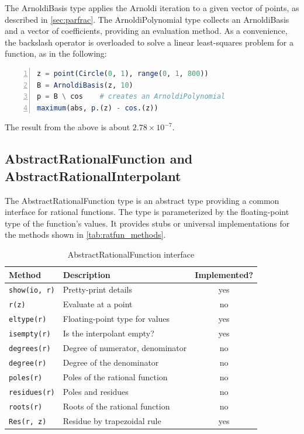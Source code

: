\documentclass{juliacon}
\begin{document}
The {ArnoldiBasis} type applies the Arnoldi iteration to a given vector of points, as described in \autoref{sec:parfrac}. The {ArnoldiPolynomial} type collects an {ArnoldiBasis} and a vector of coefficients, providing an evaluation method. As a convenience, the backslash operator is overloaded to solve a linear least-squares problem for a function, as in the following:
\begin{lstlisting}[language = Julia, numbers=left, label={lst:exmplg}, caption={Least-squares for an {ArnoldiBasis}.}]
z = point(Circle(0, 1), range(0, 1, 800))
B = ArnoldiBasis(z, 10)
p = B \ cos    # creates an ArnoldiPolynomial
maximum(abs, p.(z) - cos.(z))
\end{lstlisting}
The result from the above is about $2.78 \times 10^{-7}$. 

\subsection{AbstractRationalFunction and AbstractRationalInterpolant}

The {AbstractRationalFunction} type is an abstract type providing a common interface for rational functions. The type is parameterized by the floating-point type of the function's values. It provides stubs or universal implementations for the methods shown in \autoref{tab:ratfun_methods}. 

\begin{table}
    \caption{AbstractRationalFunction interface}
    \begin{tabular}{l|l|c}\hline
        Method & Description & Implemented? \\\hline
        \verb|show(io, r)| & Pretty-print details & yes \\
        \verb|r(z)| & Evaluate at a point & no \\
        \verb|eltype(r)| & Floating-point type for values & yes \\
        \verb|isempty(r)| & Is the interpolant empty? & yes \\
        \verb|degrees(r)| & Degree of numerator, denominator & no \\
        \verb|degree(r)| & Degree of the denominator & no \\ 
        \verb|poles(r)| & Poles of the rational function & no \\
        \verb|residues(r)| & Poles and residues & no \\
        \verb|roots(r)| & Roots of the rational function & no \\
        \verb|Res(r, z)| & Residue by trapezoidal rule & yes
    \end{tabular}
    \label{tab:ratfun_methods}
\end{table}
\end{document}
